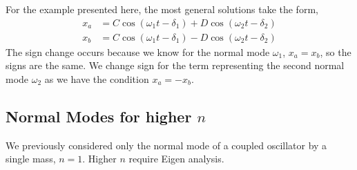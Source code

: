 \documentclass{book}
\begin{document}
\\\\
For the example presented here, the most general solutions take the form,
\begin{align}
	x_a &= C\cos(\omega_1 t - \delta_1) + D\cos(\omega_2 t - \delta_2)\\
	x_b &= C\cos(\omega_1 t - \delta_1) - D\cos(\omega_2 t - \delta_2)
\end{align} 
The sign change occurs because we know for the normal mode $\omega_1$, $x_a = x_b$, so the signs are the same. We change sign for the term representing the second normal mode $\omega_2$ as we have the condition $x_a = -x_b$. 
\subsection{Normal Modes for higher $n$}
We previously considered only the normal mode of a coupled oscillator by a single mass, $n=1$. Higher $n$ require Eigen analysis. 
\end{document}
